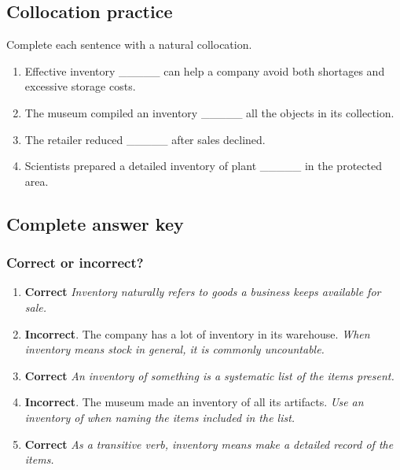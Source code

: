 \documentclass[11pt]{article}
\begin{document}
\subsection{Collocation practice}
Complete each sentence with a natural collocation.

\begin{enumerate}
  \item Effective inventory \_\_\_\_\_ can help a company avoid both shortages and excessive storage costs.
  \item The museum compiled an inventory \_\_\_\_\_ all the objects in its collection.
  \item The retailer reduced \_\_\_\_\_ after sales declined.
  \item Scientists prepared a detailed inventory of plant \_\_\_\_\_ in the protected area.
\end{enumerate}

\subsection{Complete answer key}
\subsubsection{Correct or incorrect?}
\begin{enumerate}
  \item \textbf{Correct} \emph{Inventory naturally refers to goods a business keeps available for sale.}
  \item \textbf{Incorrect}. The company has a lot of inventory in its warehouse. \emph{When inventory means stock in general, it is commonly uncountable.}
  \item \textbf{Correct} \emph{An inventory of something is a systematic list of the items present.}
  \item \textbf{Incorrect}. The museum made an inventory of all its artifacts. \emph{Use an inventory of when naming the items included in the list.}
  \item \textbf{Correct} \emph{As a transitive verb, inventory means make a detailed record of the items.}
\end{enumerate}
\end{document}
